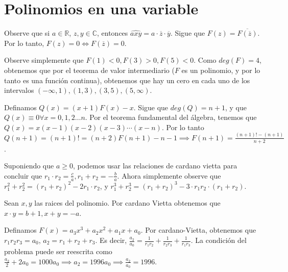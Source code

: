 \section{Polinomios en una variable}

\begin{sol}
	Observe que si $a \in \mathbb{R}$, $z, y \in \mathbb{C}$, entonces $\hat{axy} = a\cdot\overline{z}\cdot \overline{y}$. Sigue que $F(z) = \overline{F(\overline{z})}$. Por lo tanto, $F(z) = 0 \iff F(\overline{z}) = 0$. 
\end{sol}

\begin{sol}
	Observe simplemente que $F(1) < 0, F(3) > 0, F(5) <0$. Como $ deg(F) = 4$, obtenemos que por el teorema de valor intermediario ($F$ es un polinomio, y por lo tanto es una funci\'on continua), obtenemos que hay un cero en cada uno de los intervalos $(-\infty, 1), (1, 3), (3, 5), (5, \infty)$.
\end{sol}

\begin{sol}
	Definamos $Q(x) = (x+1)F(x)-x$. Sigue que $deg(Q) = n+1$, y que $Q(x) \equiv 0 \forall x = 0, 1, 2 \dots n$. Por el teorema fundamental del \'algebra, tenemos que $Q(x) = x(x-1)(x-2)(x-3)\cdots (x-n)$. Por lo tanto $Q(n+1) = (n+1)! = (n+2)F(n+1)-n-1 \implies F(n+1) = \frac{(n+1)!-(n+1)}{n+2}$.
\end{sol}

\begin{sol}
	Suponiendo que $a \geq 0$, podemos usar las relaciones de cardano vietta para concluir que $r_{1} \cdot r_{2} = \frac{c}{a}, r_{1}+r_{2} = -\frac{b}{a}$. Ahora simplemente observe que $r_{1}^{2}+r_{2}^{2} = (r_{1}+r_{2})^{2}-2r_{1} \cdot r_{2}$, y $r_{1}^{3}+r_{2}^{3} = (r_{1}+r_{2})^{3}-3\cdot r_{1}r_{2} \cdot (r_{1}+r_{2})$.
\end{sol}

\begin{sol}
	Sean $x, y$ las raices del polinomio. Por cardano Vietta obtenemos que $x\cdot y = b+1, x+y = -a$. 
\end{sol}

\begin{sol}
	Definamos $F(x) = a_{3}x^{3}+a_{2}x^{2}+a_{1}x+a_{0}$. Por cardano-Vietta, obtenemos que $r_{1}r_{2}r_{3} = a_{0}$, $a_{2} = r_{1}+r_{2}+r_{3}$. Es decir, $\frac{a_{2}}{a_{0}} = \frac{1}{r_{1}r_{2}}+\frac{1}{r_{2}r_{3}}+\frac{1}{r_{1}r_{3}}$. La condici\'on del problema puede ser reescrita como $\frac{a_{2}}{2}+2a_{0} = 1000a_{0} \implies a_{2} = 1996 a_{0} \implies \frac{a_{2}}{a_{0}} = 1996$.
\end{sol}